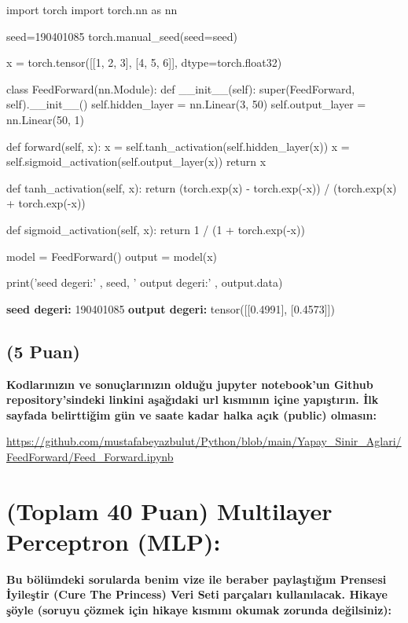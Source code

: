 \documentclass[11pt]{article}
\begin{document}
\begin{python}
import torch
import torch.nn as nn

seed=190401085
torch.manual_seed(seed=seed)

x = torch.tensor([[1, 2, 3], [4, 5, 6]], dtype=torch.float32)

class FeedForward(nn.Module):
    def __init__(self):
        super(FeedForward, self).__init__()
        self.hidden_layer = nn.Linear(3, 50)
        self.output_layer = nn.Linear(50, 1)

    def forward(self, x):
        x = self.tanh_activation(self.hidden_layer(x))
        x = self.sigmoid_activation(self.output_layer(x))
        return x
    
    def tanh_activation(self, x):
        return (torch.exp(x) - torch.exp(-x)) / (torch.exp(x) + torch.exp(-x))
    
    def sigmoid_activation(self, x):
        return 1 / (1 + torch.exp(-x))

model = FeedForward()
output = model(x)



print('seed degeri:' , seed, ' output degeri:' ,  output.data)
\end{python}

\vspace{.2in}

 \textbf{seed degeri:} 190401085   \textbf{output degeri:} tensor([[0.4991], [0.4573]])

\vspace{.6in}
\subsection{(5 Puan)} \textbf{Kodlarınızın ve sonuçlarınızın olduğu jupyter notebook'un Github repository'sindeki linkini aşağıdaki url kısmının içine yapıştırın. İlk sayfada belirttiğim gün ve saate kadar halka açık (public) olmasın:}

\vspace{.2in}
\url{https://github.com/mustafabeyazbulut/Python/blob/main/Yapay_Sinir_Aglari/FeedForward/Feed_Forward.ipynb}

\newpage
\section{(Toplam 40 Puan) Multilayer Perceptron (MLP):} 
\textbf{Bu bölümdeki sorularda benim vize ile beraber paylaştığım Prensesi İyileştir (Cure The Princess) Veri Seti parçaları kullanılacak. Hikaye şöyle (soruyu çözmek için hikaye kısmını okumak zorunda değilsiniz):} 
\end{document}
